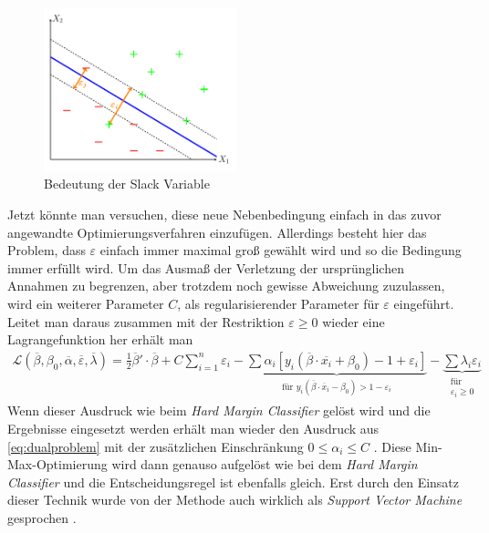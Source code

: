 \documentclass[
]{article}
\begin{document}
\begin{figure}[htb]
\centering
\includegraphics[width=0.5\textwidth,trim=0.5cm 0.5cm 0.5cm 0.5cm]{Images/slackvariable.pdf} 
        \caption{Bedeutung der Slack Variable}
        \label{fig:slackvariable}
\end{figure}

Jetzt könnte man versuchen, diese neue Nebenbedingung einfach in das
zuvor angewandte Optimierungsverfahren einzufügen. Allerdings besteht
hier das Problem, dass \(\varepsilon\) einfach immer maximal groß
gewählt wird und so die Bedingung immer erfüllt wird. Um das Ausmaß der
Verletzung der ursprünglichen Annahmen zu begrenzen, aber trotzdem noch
gewisse Abweichung zuzulassen, wird ein weiterer Parameter \(C\), als
regularisierender Parameter für \(\varepsilon\) eingeführt. Leitet man
daraus zusammen mit der Restriktion \(\varepsilon\ge0\) wieder eine
Lagrangefunktion her erhält man \begin{align}
\mathcal{L}(\overline\beta,\beta_0,\overline\alpha,\overline\varepsilon,\overline\lambda)=\frac{1}{2}\overline\beta'\cdot \overline\beta + C \sum_{i=1}^{n}\varepsilon_i-\underbrace{\sum \alpha_i[y_i(\overline\beta \cdot \overline{x_i}+\beta_0)-1+\varepsilon_i]}_{\text{für }y_i(\overline\beta \cdot \overline{x}_i-\beta_0)>1- \varepsilon_i}-\underbrace{\sum \lambda_i \varepsilon_i }_{\substack{\text{für}\\ \varepsilon_i \ge 0}}
\end{align} Wenn dieser Ausdruck wie beim
\textit{Hard Margin Classifier} gelöst wird und die Ergebnisse
eingesetzt werden erhält man wieder den Ausdruck aus
\eqref{eq:dualproblem} mit der zusätzlichen Einschränkung
\(0\le \alpha_i \le C\) \parencite{bennettSupportVectorMachines2000}.
Diese Min-Max-Optimierung wird dann genauso aufgelöst wie bei dem
\textit{Hard Margin Classifier} und die Entscheidungsregel ist ebenfalls
gleich. Erst durch den Einsatz dieser Technik wurde von der Methode auch
wirklich als \textit{Support Vector Machine} gesprochen
\parencite{vapnikEstimationDependencesBased2006}.
\end{document}

